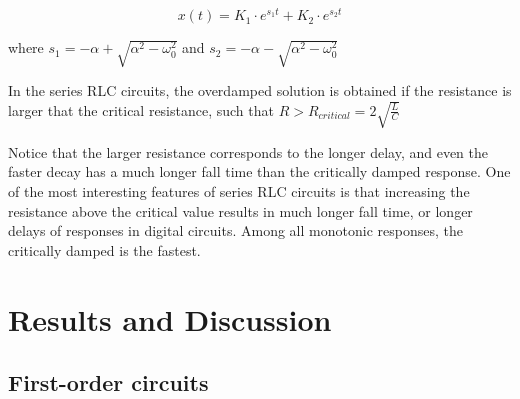 \documentclass{article}
\begin{document}
$$x(t)=K_1\cdot e^{s_1t}+K_2\cdot e^{s_2t}$$

where $s_1=-\alpha+\sqrt{\alpha^2-\omega_0^2}$ and $s_2=-\alpha-\sqrt{\alpha^2-\omega_0^2}$

In the series RLC circuits, the overdamped solution is obtained if the resistance is larger that the critical resistance, such that $R>R_{critical}=2\sqrt{\frac{L}{C}}$

Notice that the larger resistance corresponds to the longer delay, and even the faster decay has a much longer fall time than the critically damped response. 
One of the most interesting features of series RLC circuits is that increasing the resistance above the critical value results in much longer fall time, or longer delays of responses in digital circuits. Among all monotonic responses, the critically damped is the fastest.

\section{Results and Discussion}

\subsection{First-order circuits}
\end{document}
